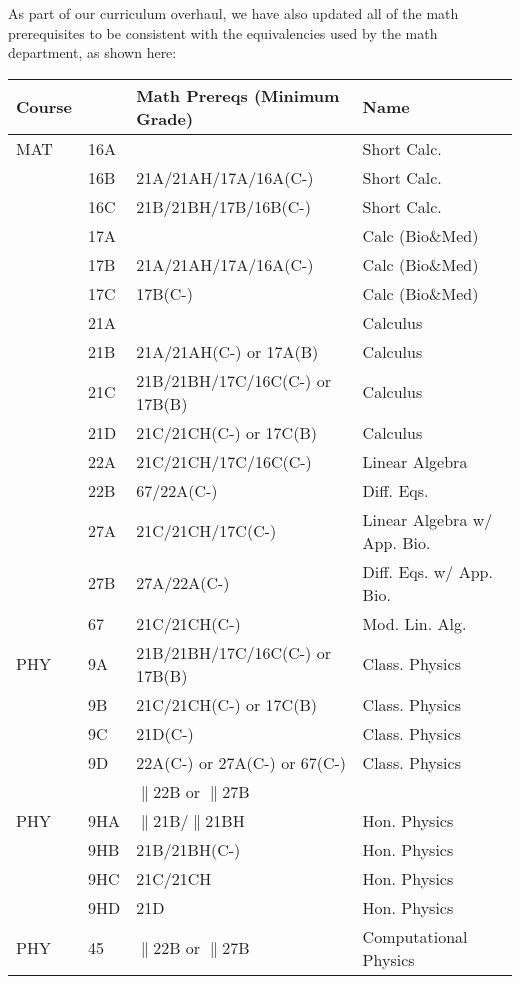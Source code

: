 \documentclass[12pt]{article}
\begin{document}
As part of our curriculum overhaul, we have also updated all of the
math prerequisites to be consistent with the equivalencies used by the
math department, as shown here:
\label{tbl:math-prereqs}
\begin{center}
\begin{tabular}{|llll|}
\hline
Course & & Math Prereqs (Minimum Grade)& Name \\
\hline
MAT & 16A & & Short Calc.\\
    & 16B & 21A/21AH/17A/16A(C-) & Short Calc.\\
    & 16C & 21B/21BH/17B/16B(C-) & Short Calc.\\
    & 17A &                      & Calc (Bio\&Med)\\
    & 17B & 21A/21AH/17A/16A(C-) & Calc (Bio\&Med)\\
    & 17C & 17B(C-)              & Calc (Bio\&Med)\\
    & 21A &                      & Calculus \\
    & 21B & 21A/21AH(C-) or 17A(B) & Calculus \\
    & 21C & 21B/21BH/17C/16C(C-) or 17B(B) & Calculus\\
    & 21D & 21C/21CH(C-) or 17C(B)  & Calculus \\
    & 22A & 21C/21CH/17C/16C(C-)    & Linear Algebra \\
    & 22B & 67/22A(C-)              & Diff. Eqs. \\
    & 27A & 21C/21CH/17C(C-)        & Linear Algebra w/ App. Bio. \\
    & 27B & 27A/22A(C-)             & Diff. Eqs. w/ App. Bio.\\
    & 67  & 21C/21CH(C-)            & Mod. Lin. Alg. \\
\hline
\hline
PHY & 9A & 21B/21BH/17C/16C(C-) or 17B(B) & Class. Physics\\
    & 9B & 21C/21CH(C-) or 17C(B) & Class. Physics\\
    & 9C & 21D(C-) & Class. Physics\\
    & 9D & 22A(C-) or 27A(C-) or 67(C-) & Class. Physics\\
    &    & $\parallel$22B or $\parallel$27B & \\
\hline
\hline
PHY & 9HA & $\parallel$21B/$\parallel$21BH & Hon. Physics\\
    & 9HB    & 21B/21BH(C-) & Hon. Physics \\
    & 9HC    & 21C/21CH & Hon. Physics \\
    & 9HD    & 21D  & Hon. Physics \\
\hline
PHY & 45     & $\parallel$22B or $\parallel$27B & Computational Physics \\
\hline
\end{tabular}
\end{center}
\end{document}
